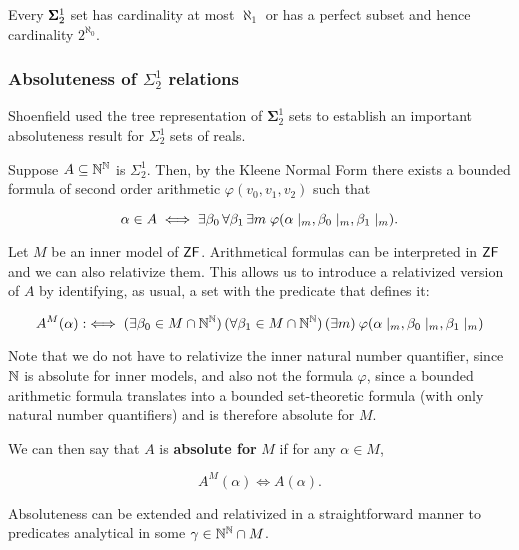 \begin{corollary}\label{cor-cardinality-sigma12}Every $\pmb{\Sigma}^1_2$ set has cardinality at most $\aleph_1$ or has a perfect subset and hence cardinality $2^{\aleph_0}$.

\end{corollary}\subsubsection{Absoluteness of $\Sigma^1_2$ relations}

Shoenfield used the tree representation of $\mathbf{\Sigma}^1_2$ sets to establish an important absoluteness result for $\Sigma^1_2$ sets of reals.

Suppose $A \subseteq \mathbb{N}^{\mathbb{N}}$ is $\Sigma^1_2$. Then, by the Kleene Normal Form there exists a bounded formula of second order arithmetic $\varphi(v_0,v_1,v_2)$ such that

\begin{equation}
\alpha \in A \iff \exists \beta_0 \, \forall \beta_1 \, \exists m \; \varphi(\alpha\mid_{m},\beta_0\mid_{m},\beta_1\mid_{m}).
\end{equation}

Let $M$ be an inner model of $\mathsf{ZF}$. Arithmetical formulas can be interpreted in $\mathsf{ZF}$ and we can also relativize them. This allows us to introduce a relativized version of $A$ by identifying, as usual, a set with the predicate that defines it:

\begin{equation}
A^M(\alpha) :\iff (\exists \beta_0 \in M\cap \mathbb{N}^{\mathbb{N}}) \, (\forall \beta_1\in M \cap \mathbb{N}^{\mathbb{N}})  \, (\exists m) \: \varphi(\alpha\mid_{m},\beta_0\mid_{m},\beta_1\mid_{m})
\end{equation}

Note that we do not have to relativize the inner natural number quantifier, since $\mathbb{N}$ is absolute for inner models, and also not the formula $\varphi$, since a bounded arithmetic formula translates into a bounded set-theoretic formula (with only natural number quantifiers) and is therefore absolute for $M$.

We can then say that $A$ is \textbf{absolute for} $M$ if for any $\alpha\in M$,

\begin{equation}
A^M(\alpha) \iff A(\alpha).
\end{equation}

Absoluteness can be extended and relativized in a straightforward manner to predicates analytical in some $\gamma \in \mathbb{N}^{\mathbb{N}} \cap M$.

